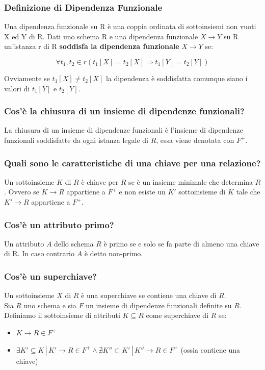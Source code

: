 \documentclass{article}
\begin{document}
\subsubsection{Definizione di Dipendenza Funzionale}
Una dipendenza funzionale su R è una coppia ordinata di sottoinsiemi non vuoti X ed Y di R. Dati uno schema R e una dipendenza funzionale $X\to Y$ su R un'istanza r di R \textbf{soddisfa la dipendenza funzionale} $X \rightarrow Y$ se:

\[ \forall t_1,t_2 \in r(t_1[X] = t_2[X] \Rightarrow t_1[Y] = t_2[Y]) \]

Ovviamente se $t_1[X]\not = t_2[X]$ la dipendenza è soddisfatta comunque siano i valori di $t_1[Y]$ e $t_2[Y]$.

\subsubsection{Cos'è la chiusura di un insieme di dipendenze funzionali?}
La chiusura di un insieme di dipendenze funzionali è l'insieme di dipendenze funzionali soddisfatte da ogni istanza legale di $R$, essa viene denotata con $F^+$.\\

\subsubsection{Quali sono le caratteristiche di una chiave per una relazione?}
Un sottoinsieme $K$ di $R$ è chiave per $R$ se è un insieme minimale che determina $R$. Ovvero se $K \rightarrow R$ appartiene a $F^+$ e non esiste un $K'$ sottoinsieme di $K$ tale che $K' \rightarrow R$ appartiene a $F^+$.\\

\subsubsection{Cos'è un attributo primo?}
Un attributo $A$ dello schema $R$ è primo se e solo se fa parte di almeno una chiave di R. In caso contrario $A$ è detto non-primo.\\

\subsubsection{Cos'è un superchiave?}
Un sottoinsieme $X$ di $R$ è una superchiave se contiene una chiave di $R$.\\

Sia $R$ uno schema e sia $F$ un insieme di dipendenze funzionali definite su $R$. Definiamo il sottoinsieme di attributi $K \subseteq R$ come superchiave di $R$ se:
\begin{itemize}
    \item $K \rightarrow R \in F^+$
    \item $\exists K' \subseteq K \,|\, K' \rightarrow R \in F^+ \land \nexists K'' \subset K' \,|\, K'' \rightarrow R \in F^+$ (ossia contiene una chiave)
\end{itemize}
\end{document}
